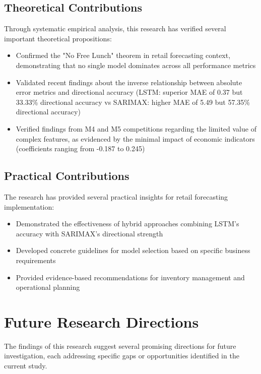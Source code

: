\documentclass[12pt,a4paper]{report}
\begin{document}
\subsection{Theoretical Contributions}
Through systematic empirical analysis, this research has verified several important theoretical propositions:

\begin{itemize}
    \item Confirmed the "No Free Lunch" theorem in retail forecasting context, demonstrating that no single model dominates across all performance metrics
    \item Validated recent findings about the inverse relationship between absolute error metrics and directional accuracy (LSTM: superior MAE of 0.37 but 33.33\% directional accuracy vs SARIMAX: higher MAE of 5.49 but 57.35\% directional accuracy)
    \item Verified findings from M4 and M5 competitions regarding the limited value of complex features, as evidenced by the minimal impact of economic indicators (coefficients ranging from -0.187 to 0.245)
\end{itemize}

\subsection{Practical Contributions}
The research has provided several practical insights for retail forecasting implementation:

\begin{itemize}
    \item Demonstrated the effectiveness of hybrid approaches combining LSTM's accuracy with SARIMAX's directional strength
    \item Developed concrete guidelines for model selection based on specific business requirements
    \item Provided evidence-based recommendations for inventory management and operational planning
\end{itemize}

\section{Future Research Directions}
The findings of this research suggest several promising directions for future investigation, each addressing specific gaps or opportunities identified in the current study.
\end{document}
